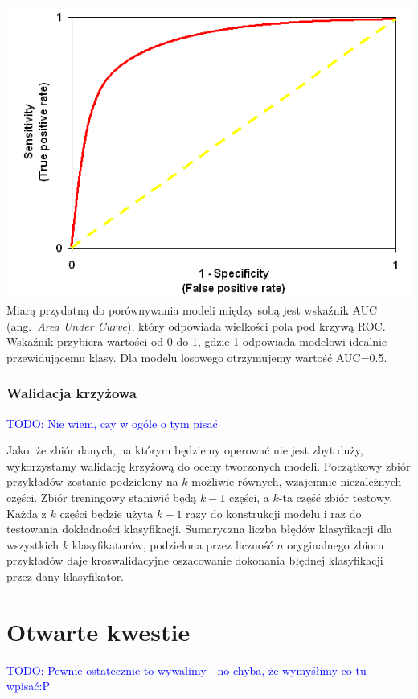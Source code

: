 \documentclass{article}
\newcommand{\TODO}[1]{\textcolor{blue}{TODO: #1}}
\newcommand{\ang}[1]{ang.~{\itshape #1}}
\begin{document}
\includegraphics[scale=0.55]{../pictures/decoy4}\\

Miarą przydatną do porównywania modeli między sobą jest wskaźnik AUC (\ang{Area Under Curve}), który odpowiada wielkości pola pod krzywą ROC. Wskaźnik przybiera wartości od 0 do 1, gdzie 1 odpowiada modelowi idealnie przewidującemu klasy. Dla modelu losowego otrzymujemy wartość AUC=0.5.

\subsubsection{Walidacja krzyżowa}
\TODO{Nie wiem, czy w ogóle o tym pisać}

Jako, że zbiór danych, na którym będziemy operować nie jest zbyt duży, wykorzystamy walidację krzyżową do oceny tworzonych modeli. Początkowy zbiór przykładów zostanie podzielony na $k$ możliwie równych, wzajemnie niezależnych części. Zbiór treningowy staniwić będą $k-1$ części, a $k$-ta część zbiór testowy. Każda z $k$ części będzie użyta $k-1$ razy do konstrukcji modelu i raz do testowania dokładności klasyfikacji. Sumaryczna liczba błędów klasyfikacji dla wszystkich $k$ klasyfikatorów, podzielona przez liczność $n$ oryginalnego zbioru przykładów daje kroswalidacyjne oszacowanie dokonania błędnej klasyfikacji przez dany klasyfikator.

\section{Otwarte kwestie}
\TODO{Pewnie ostatecznie to wywalimy - no chyba, że wymyśłimy co tu wpisać:P}
\end{document}
